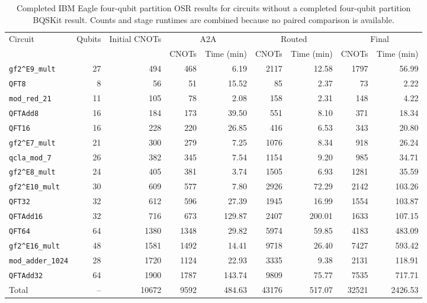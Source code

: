 \begin{table}[p]
\centering
\scriptsize
\begin{tabular}{lrr|rr|rr|rr}
\hline
Circuit & Qubits & Initial CNOTs & \multicolumn{2}{c|}{A2A} & \multicolumn{2}{c|}{Routed} & \multicolumn{2}{c}{Final} \\
 & & & CNOTs & Time (min) & CNOTs & Time (min) & CNOTs & Time (min) \\
\hline
\texttt{gf2\textasciicircum{}E9\_mult} & 27 & 494 & 468 & 6.19 & 2117 & 12.58 & 1797 & 56.99 \\
\texttt{QFT8} & 8 & 56 & 51 & 15.52 & 85 & 2.37 & 73 & 2.22 \\
\texttt{mod\_red\_21} & 11 & 105 & 78 & 2.08 & 158 & 2.31 & 148 & 4.22 \\
\texttt{QFTAdd8} & 16 & 184 & 173 & 39.50 & 551 & 8.10 & 371 & 18.34 \\
\texttt{QFT16} & 16 & 228 & 220 & 26.85 & 416 & 6.53 & 343 & 20.80 \\
\texttt{gf2\textasciicircum{}E7\_mult} & 21 & 300 & 279 & 7.25 & 1076 & 8.34 & 918 & 26.24 \\
\texttt{qcla\_mod\_7} & 26 & 382 & 345 & 7.54 & 1154 & 9.20 & 985 & 34.71 \\
\texttt{gf2\textasciicircum{}E8\_mult} & 24 & 405 & 381 & 3.74 & 1505 & 6.93 & 1281 & 35.59 \\
\texttt{gf2\textasciicircum{}E10\_mult} & 30 & 609 & 577 & 7.80 & 2926 & 72.29 & 2142 & 103.26 \\
\texttt{QFT32} & 32 & 612 & 596 & 27.39 & 1945 & 16.99 & 1554 & 103.87 \\
\texttt{QFTAdd16} & 32 & 716 & 673 & 129.87 & 2407 & 200.01 & 1633 & 107.15 \\
\texttt{QFT64} & 64 & 1380 & 1348 & 29.82 & 5974 & 59.85 & 4183 & 483.09 \\
\texttt{gf2\textasciicircum{}E16\_mult} & 48 & 1581 & 1492 & 14.41 & 9718 & 26.40 & 7427 & 593.42 \\
\texttt{mod\_adder\_1024} & 28 & 1720 & 1124 & 22.93 & 3335 & 9.38 & 2131 & 118.91 \\
\texttt{QFTAdd32} & 64 & 1900 & 1787 & 143.74 & 9809 & 75.77 & 7535 & 717.71 \\
\hline
Total & -- & 10672 & 9592 & 484.63 & 43176 & 517.07 & 32521 & 2426.53 \\
\hline
\end{tabular}
\caption{Completed IBM Eagle four-qubit partition OSR results for circuits without a completed four-qubit partition BQSKit result. Counts and stage runtimes are combined because no paired comparison is available.}
\label{tab:osr-four-qubit-unpaired-ibm-eagle}
\end{table}


